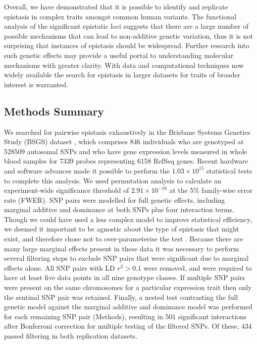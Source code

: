 \documentclass{article}
\begin{document}
Overall, we have demonstrated that it is possible to identify and replicate epistasis in complex traits amongst common human variants. The functional analysis of the significant epistatic loci suggests that there are a large number of possible mechanisms that can lead to non-additive genetic variation, thus it is not surprising that instances of epistasis should be widespread. Further research into such genetic effects may provide a useful portal to understanding molecular mechanisms with greater clarity. With data and computational techniques now widely available the search for epistasis in larger datasets for traits of broader interest is warranted.


\subsection{Methods Summary}
We searched for pairwise epistasis exhaustively in the Brisbane Systems Genetics Study (BSGS) dataset \cite{Powell2012}, which comprises 846 individuals who are genotyped at 528509 autosomal SNPs and who have gene expression levels measured in whole blood samples for 7339 probes representing 6158 RefSeq genes. Recent hardware and software \cite{Hemani2011} advances made it possible to perform the $1.03 \times 10^{15}$ statistical tests to complete this analysis. We used permutation analysis \cite{Churchill1994a} to calculate an experiment-wide significance threshold of $2.91 \times 10^{-16}$ at the 5\% family-wise error rate (FWER). SNP pairs were modelled for full genetic effects, including marginal additive and dominance at both SNPs plus four interaction terms. Though we could have used a less complex model to improve statistical efficiency, we deemed it important to be agnostic about the type of epistasis that might exist, and therefore chose not to over-parameterise the test \cite{Marchini2005, Hemani2013}. Because there are many large marginal effects present in these data it was necessary to perform several filtering steps to exclude SNP pairs that were significant due to marginal effects alone. All SNP pairs with LD $r^2 > 0.1$ were removed, and were required to have at least five data points in all nine genotype classes. If multiple SNP pairs were present on the same chromosomes for a particular expression trait then only the sentinal SNP pair was retained. Finally, a nested test contrasting the full genetic model against the marginal additive and dominance model was performed for each remaining SNP pair (Methods), resulting in 501 significant interactions after Bonferroni correction for multiple testing of the filtered SNPs. Of these, 434 passed filtering in both replication datasets.
\end{document}
